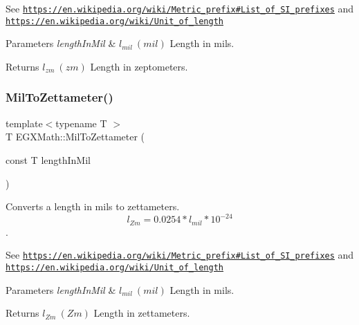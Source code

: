 See \href{https://en.wikipedia.org/wiki/Metric_prefix#List_of_SI_prefixes}{\tt https\+://en.\+wikipedia.\+org/wiki/\+Metric\+\_\+prefix\#\+List\+\_\+of\+\_\+\+S\+I\+\_\+prefixes} and \href{https://en.wikipedia.org/wiki/Unit_of_length}{\tt https\+://en.\+wikipedia.\+org/wiki/\+Unit\+\_\+of\+\_\+length} 
\begin{DoxyParams}{Parameters}
{\em length\+In\+Mil} & $ l_{mil}\ (mil)$ Length in mils. \\
\hline
\end{DoxyParams}
\begin{DoxyReturn}{Returns}
$ l_{zm}\ (zm)$ Length in zeptometers. 
\end{DoxyReturn}
\mbox{\label{group___e_g_x_math-_conversions-_length_conversions-_imperial-_mil-_s_i_ga431c92390fcf7f25c6c57e9a3124153b}} 
\subsubsection{\texorpdfstring{Mil\+To\+Zettameter()}{MilToZettameter()}}
{\footnotesize\ttfamily template$<$typename T $>$ \\
T E\+G\+X\+Math\+::\+Mil\+To\+Zettameter (\begin{DoxyParamCaption}\item[{const T}]{length\+In\+Mil }\end{DoxyParamCaption})}



Converts a length in mils to zettameters. \[ l_{Zm}=0.0254* l_{mil} * 10^{-24} \]. 

See \href{https://en.wikipedia.org/wiki/Metric_prefix#List_of_SI_prefixes}{\tt https\+://en.\+wikipedia.\+org/wiki/\+Metric\+\_\+prefix\#\+List\+\_\+of\+\_\+\+S\+I\+\_\+prefixes} and \href{https://en.wikipedia.org/wiki/Unit_of_length}{\tt https\+://en.\+wikipedia.\+org/wiki/\+Unit\+\_\+of\+\_\+length} 
\begin{DoxyParams}{Parameters}
{\em length\+In\+Mil} & $ l_{mil}\ (mil)$ Length in mils. \\
\hline
\end{DoxyParams}
\begin{DoxyReturn}{Returns}
$ l_{Zm}\ (Zm)$ Length in zettameters. 
\end{DoxyReturn}
